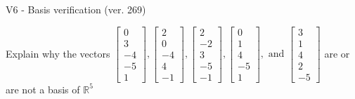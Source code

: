 \begin{exercise}
  \begin{exerciseTitle}V6 - Basis verification (ver. 269)\end{exerciseTitle}
  \begin{exerciseStatement}
    Explain why the vectors \(\left[\begin{array}{r}
0 \\
3 \\
-4 \\
-5 \\
1
\end{array}\right] , \left[\begin{array}{r}
2 \\
0 \\
-4 \\
4 \\
-1
\end{array}\right] , \left[\begin{array}{r}
2 \\
-2 \\
3 \\
-5 \\
-1
\end{array}\right] , \left[\begin{array}{r}
0 \\
1 \\
4 \\
-5 \\
1
\end{array}\right] , \text{ and } \left[\begin{array}{r}
3 \\
1 \\
4 \\
2 \\
-5
\end{array}\right]\) are or are not a basis of \(\mathbb{R}^5\)	



\end{exerciseStatement}
\end{exercise}
